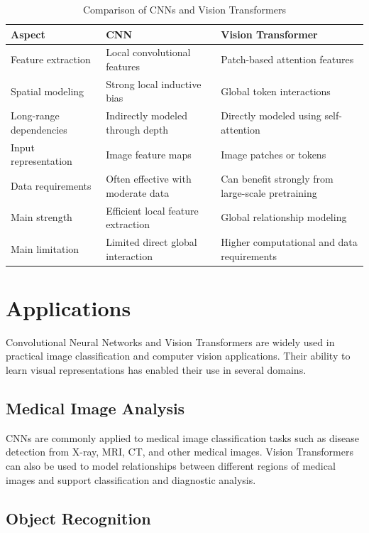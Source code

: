 \documentclass[conference]{IEEEtran}
\begin{document}
\begin{table}[htbp]
\caption{Comparison of CNNs and Vision Transformers}
\label{tab:cnn_vit_comparison}
\centering
\begin{tabular}{|p{1.4cm}|p{2.5cm}|p{2.5cm}|}
\hline
\textbf{Aspect} & \textbf{CNN} & \textbf{Vision Transformer} \\
\hline
Feature extraction & Local convolutional features & Patch-based attention features \\
\hline
Spatial modeling & Strong local inductive bias & Global token interactions \\
\hline
Long-range dependencies & Indirectly modeled through depth & Directly modeled using self-attention \\
\hline
Input representation & Image feature maps & Image patches or tokens \\
\hline
Data requirements & Often effective with moderate data & Can benefit strongly from large-scale pretraining \\
\hline
Main strength & Efficient local feature extraction & Global relationship modeling \\
\hline
Main limitation & Limited direct global interaction & Higher computational and data requirements \\
\hline
\end{tabular}
\end{table}


\section{Applications}

Convolutional Neural Networks and Vision Transformers are widely used in practical image classification and computer vision applications. Their ability to learn visual representations has enabled their use in several domains.

\subsection{Medical Image Analysis}

CNNs are commonly applied to medical image classification tasks such as disease detection from X-ray, MRI, CT, and other medical images. Vision Transformers can also be used to model relationships between different regions of medical images and support classification and diagnostic analysis.

\subsection{Object Recognition}
\end{document}
